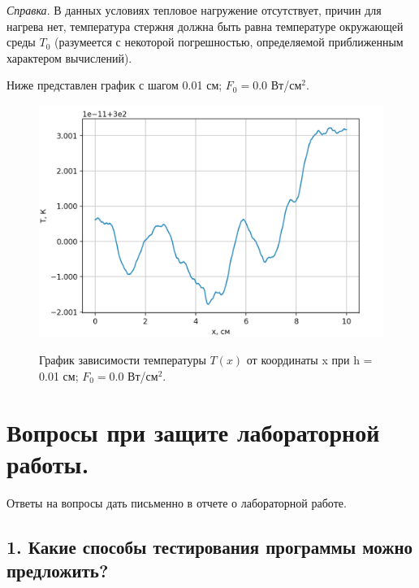 \documentclass[a4paper,12pt]{article}
\begin{document}
	\begin{center}
		\textit{Справка}. В данных условиях тепловое нагружение отсутствует, причин для
		нагрева нет, температура стержня должна быть равна температуре окружающей
		среды $T_0$
		(разумеется с некоторой погрешностью, определяемой приближенным
		характером вычислений).
	\end{center}

	Ниже представлен график с шагом 0.01 см; $F_0 = 0.0$ Вт/см$^2$.
	
	\begin{figure}[h!]
		\begin{center}
			{\includegraphics[scale = 0.7]{0.png}}
			\label{ris:0}
		\end{center}
		\caption{График зависимости температуры $T(x)$ от координаты x при h = 0.01 см; $F_0 = 0.0$ Вт/см$^2$.}
	\end{figure}

	\newpage

	\section*{Вопросы при защите лабораторной работы.}
	
	Ответы на вопросы дать письменно в отчете о лабораторной работе.
	
	\subsection*{1. Какие способы тестирования программы можно предложить?}
	
\end{document}
